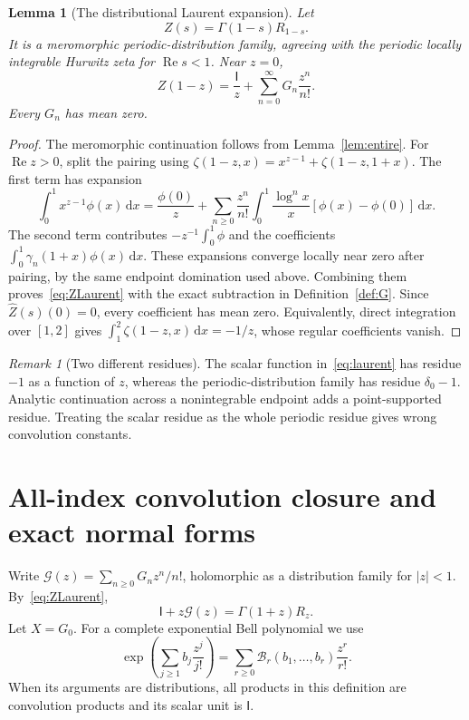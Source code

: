 \documentclass[11pt]{article}
\numberwithin{equation}{section}
\newtheorem{lemma}[theorem]{Lemma}
\theoremstyle{definition}
\theoremstyle{remark}
\newtheorem{remark}[theorem]{Remark}
\DeclareMathOperator{\Rea}{Re}
\newcommand{\Id}{\mathsf I}
\newcommand{\G}{\mathcal G}
\newcommand{\dd}{\,\mathrm d}
\newcommand{\cB}{\mathcal B}
\begin{document}
\begin{lemma}[The distributional Laurent expansion]\label{lem:Laurentdist}
Let
\[
 Z(s)=\Gamma(1-s)R_{1-s}.
\]
It is a meromorphic periodic-distribution family, agreeing with the
periodic locally integrable Hurwitz zeta for $\Rea s<1$. Near $z=0$,
\begin{equation}\label{eq:ZLaurent}
 Z(1-z)=\frac{\Id}{z}+\sum_{n=0}^\infty G_n\frac{z^n}{n!}.
\end{equation}
Every $G_n$ has mean zero.
\end{lemma}
\begin{proof}
The meromorphic continuation follows from Lemma~\ref{lem:entire}. For
$\Rea z>0$, split the pairing using
$\zeta(1-z,x)=x^{z-1}+\zeta(1-z,1+x)$. The first term has expansion
\[
 \int_0^1x^{z-1}\phi(x)\dd x
 =\frac{\phi(0)}z+
   \sum_{n\ge0}\frac{z^n}{n!}
   \int_0^1\frac{\log^n x}{x}[\phi(x)-\phi(0)]\dd x.
\]
The second term contributes $-z^{-1}\int_0^1\phi$ and the coefficients
$\int_0^1\gamma_n(1+x)\phi(x)\dd x$. These expansions converge locally
near zero after pairing, by the same endpoint domination used above.
Combining them proves~\eqref{eq:ZLaurent} with the exact subtraction in
Definition~\ref{def:G}. Since $\widehat Z(s)(0)=0$, every coefficient has
mean zero. Equivalently, direct integration over $[1,2]$ gives
$\int_1^2\zeta(1-z,x)\dd x=-1/z$, whose regular coefficients vanish.
\end{proof}

\begin{remark}[Two different residues]
The scalar function in~\eqref{eq:laurent} has residue $-1$ as a function
of $z$, whereas the periodic-distribution family has residue
$\delta_0-1$. Analytic continuation across a nonintegrable endpoint adds
a point-supported residue. Treating the scalar residue as the whole
periodic residue gives wrong convolution constants.
\end{remark}

\section{All-index convolution closure and exact normal forms}
\label{sec:algebra}
Write $\G(z)=\sum_{n\ge0}G_nz^n/n!$, holomorphic as a distribution family
for $|z|<1$. By~\eqref{eq:ZLaurent},
\begin{equation}\label{eq:masterG}
 \Id+z\G(z)=\Gamma(1+z)R_z.
\end{equation}
Let $X=G_0$. For a complete exponential Bell polynomial we use
\begin{equation}\label{eq:Belldef}
 \exp\left(\sum_{j\ge1}b_j\frac{z^j}{j!}\right)
 =\sum_{r\ge0}\cB_r(b_1,\ldots,b_r)\frac{z^r}{r!}.
\end{equation}
When its arguments are distributions, all products in this definition
are convolution products and its scalar unit is $\Id$.
\end{document}
